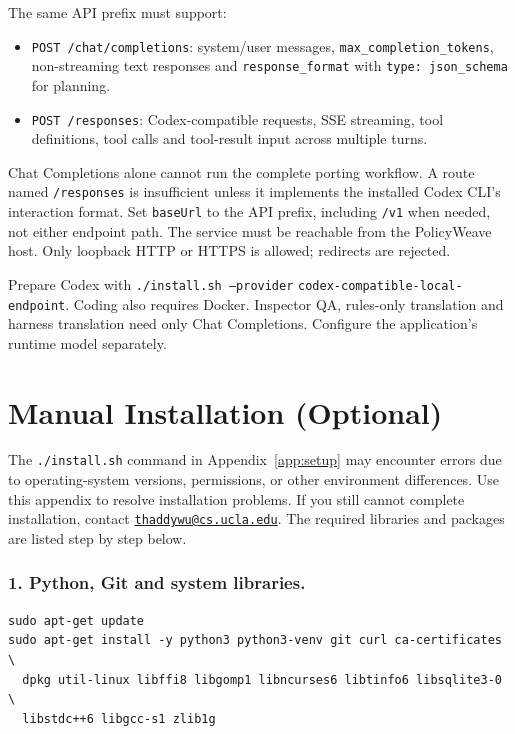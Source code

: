\documentclass[10pt,letterpaper]{article}
\begin{document}
The same API prefix must support:
\begin{itemize}
  \item \texttt{POST /chat/completions}: system/user messages,
    \texttt{max\_completion\_tokens}, non-streaming text responses and
    \texttt{response\_format} with \texttt{type: json\_schema} for planning.
  \item \texttt{POST /responses}: Codex-compatible requests, SSE streaming,
    tool definitions, tool calls and tool-result input across multiple turns.
\end{itemize}
Chat Completions alone cannot run the complete porting workflow. A route named
\texttt{/responses} is insufficient unless it implements the installed Codex
CLI's interaction format.
Set \texttt{baseUrl} to the API prefix, including \texttt{/v1} when needed,
not either endpoint path. The service must be reachable from the PolicyWeave
host. Only loopback HTTP or HTTPS is allowed; redirects are rejected.

Prepare Codex with \texttt{./install.sh --provider}
\nolinkurl{codex-compatible-local-endpoint}. Coding also requires Docker.
Inspector QA, rules-only translation and harness translation need only Chat
Completions. Configure the application's runtime model separately.

\clearpage
\section{Manual Installation (Optional)}
\label{app:manual-setup}

The \texttt{./install.sh} command in Appendix~\ref{app:setup} may encounter
errors due to operating-system versions, permissions, or other environment
differences. Use this appendix to resolve installation problems. If you still
cannot complete installation, contact
\href{mailto:thaddywu@cs.ucla.edu}{\nolinkurl{thaddywu@cs.ucla.edu}}.
The required libraries and packages are listed step by step below.

\subsubsection*{1. Python, Git and system libraries.}
\begin{lstlisting}
sudo apt-get update
sudo apt-get install -y python3 python3-venv git curl ca-certificates \
  dpkg util-linux libffi8 libgomp1 libncurses6 libtinfo6 libsqlite3-0 \
  libstdc++6 libgcc-s1 zlib1g
\end{lstlisting}
\end{document}
